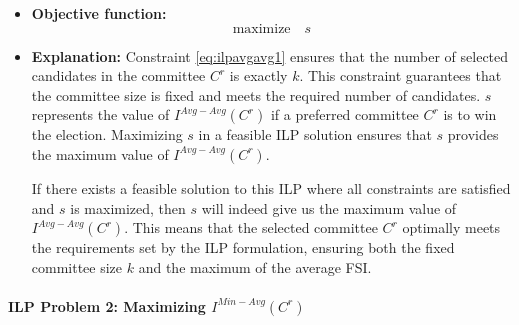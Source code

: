 \documentclass{article}
\begin{document}
\begin{itemize}
  \item  \textbf{Objective function:}
  \[\text{maximize} \quad s\]

 \item  \textbf{Explanation:}
Constraint \ref{eq:ilpavgavg1} ensures that the number of selected candidates in the committee \(C^r\) is exactly \(k\). This constraint guarantees that the committee size is fixed and meets the required number of candidates. \(s\) represents the value of $I^{Avg-Avg}(C^{r})$ if a preferred committee \(C^r\) is to win the election. Maximizing \(s\) in a feasible ILP solution ensures that \(s\) provides the maximum value of \(I^{Avg-Avg}(C^{r})\). 

If there exists a feasible solution to this ILP where all constraints are satisfied and \(s\) is maximized, then \(s\) will indeed give us the maximum value of \(I^{Avg-Avg}(C^{r})\). This means that the selected committee \(C^r\) optimally meets the requirements set by the ILP formulation, ensuring both the fixed committee size \(k\) and the maximum of the average FSI. 
\end{itemize}

\paragraph*{ILP Problem 2: Maximizing $I^{Min-Avg}(C^{r})$}\mbox{} \\
\end{document}
